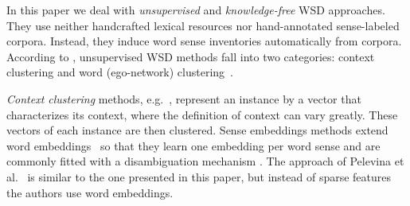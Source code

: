 \documentclass[11pt]{article}
\begin{document}


In this paper we deal with \textit{unsupervised} and \textit{knowledge-free} WSD approaches. They use neither handcrafted lexical resources nor hand-annotated sense-labeled corpora. Instead, they induce word sense inventories automatically from corpora. According to , unsupervised WSD methods fall into two categories: context clustering \cite{pedersen1997distinguishing,Schutze1998} and word (ego-network) clustering~\cite{lin1998information,pantel2002,Widdows2002,Biemann2006,Hope2013}. 

\textit{Context clustering} methods, e.g.~\cite{Schutze1998}, represent an instance by a vector that characterizes its context, where the definition of context can vary greatly. These vectors of each instance are then clustered. 
Sense embeddings methods extend word embeddings~\cite{mikolov2013efficient} so that they learn one embedding per word sense and are commonly fitted with a disambiguation mechanism \cite{Huang2012,tianEtAl2014,neelakantanefficient,bartunov2015breaking,li2015multi}. The approach of Pelevina et al.~ is similar to the one presented in this paper, but instead of sparse features the authors use word embeddings. 
\end{document}
